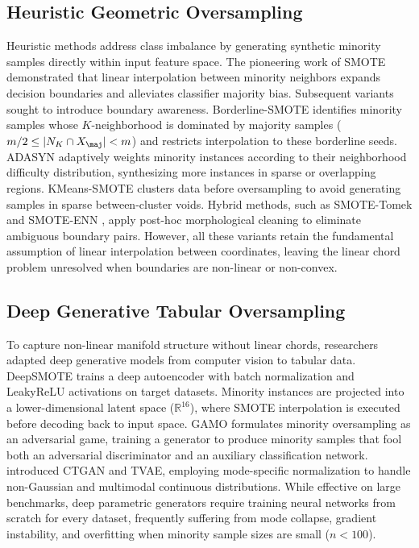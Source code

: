 \documentclass[sn-basic]{sn-jnl}
\begin{document}
\subsection{Heuristic Geometric Oversampling}
Heuristic methods address class imbalance by generating synthetic minority samples directly within input feature space. The pioneering work of SMOTE \citep{chawla2002smote} demonstrated that linear interpolation between minority neighbors expands decision boundaries and alleviates classifier majority bias. Subsequent variants sought to introduce boundary awareness. Borderline-SMOTE \citep{han2005borderline} identifies minority samples whose $K$-neighborhood is dominated by majority samples ($m/2 \le |N_K \cap X_{\maj}| < m$) and restricts interpolation to these borderline seeds. ADASYN \citep{he2008adasyn} adaptively weights minority instances according to their neighborhood difficulty distribution, synthesizing more instances in sparse or overlapping regions. KMeans-SMOTE \citep{douzas2018improving} clusters data before oversampling to avoid generating samples in sparse between-cluster voids. Hybrid methods, such as SMOTE-Tomek and SMOTE-ENN \citep{batista2004study}, apply post-hoc morphological cleaning to eliminate ambiguous boundary pairs. However, all these variants retain the fundamental assumption of linear interpolation between coordinates, leaving the linear chord problem unresolved when boundaries are non-linear or non-convex.

\subsection{Deep Generative Tabular Oversampling}
To capture non-linear manifold structure without linear chords, researchers adapted deep generative models from computer vision to tabular data. DeepSMOTE \citep{dinsdale2021deepsmote} trains a deep autoencoder with batch normalization and LeakyReLU activations on target datasets. Minority instances are projected into a lower-dimensional latent space ($\mathbb{R}^{16}$), where SMOTE interpolation is executed before decoding back to input space. GAMO \citep{mullick2020generative} formulates minority oversampling as an adversarial game, training a generator to produce minority samples that fool both an adversarial discriminator and an auxiliary classification network. \citet{xu2019modeling} introduced CTGAN and TVAE, employing mode-specific normalization to handle non-Gaussian and multimodal continuous distributions. While effective on large benchmarks, deep parametric generators require training neural networks from scratch for every dataset, frequently suffering from mode collapse, gradient instability, and overfitting when minority sample sizes are small ($n < 100$).
\end{document}
